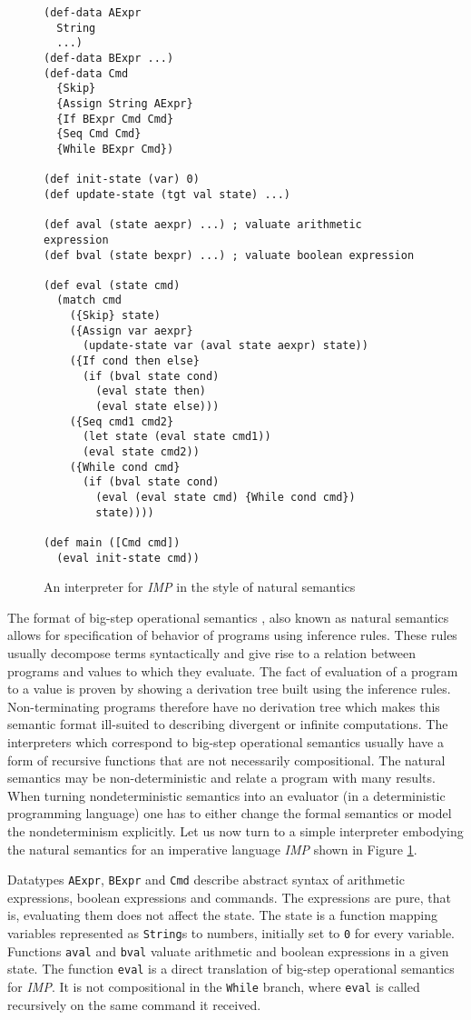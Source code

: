 \begin{figure}[ht!]
\begin{lstlisting}
(def-data AExpr
  String
  ...)
(def-data BExpr ...)
(def-data Cmd
  {Skip}
  {Assign String AExpr}
  {If BExpr Cmd Cmd}
  {Seq Cmd Cmd}
  {While BExpr Cmd})

(def init-state (var) 0)
(def update-state (tgt val state) ...)

(def aval (state aexpr) ...) ; valuate arithmetic expression
(def bval (state bexpr) ...) ; valuate boolean expression

(def eval (state cmd)
  (match cmd
    ({Skip} state)
    ({Assign var aexpr}
      (update-state var (aval state aexpr) state))
    ({If cond then else}
      (if (bval state cond)
        (eval state then)
        (eval state else)))
    ({Seq cmd1 cmd2}
      (let state (eval state cmd1))
      (eval state cmd2))
    ({While cond cmd}
      (if (bval state cond)
        (eval (eval state cmd) {While cond cmd})
        state))))

(def main ([Cmd cmd])
  (eval init-state cmd))
\end{lstlisting}
\caption{An interpreter for \textit{IMP} in the style of natural semantics}
\label{fig:evaluator-imp}
\end{figure}

The format of big-step operational semantics \cite{kahn-natural-semantics}, also known as natural semantics allows for specification of behavior of programs using inference rules.
These rules usually decompose terms syntactically and give rise to a relation between programs and values to which they evaluate.
The fact of evaluation of a program to a value is proven by showing a derivation tree built using the inference rules.
Non-terminating programs therefore have no derivation tree which makes this semantic format ill-suited to describing divergent or infinite computations.
The interpreters which correspond to big-step operational semantics usually have a form of recursive functions that are not necessarily compositional.
The natural semantics may be non-deterministic and relate a program with many results.
When turning nondeterministic semantics into an evaluator (in a deterministic programming language) one has to either change the formal semantics or model the nondeterminism explicitly.
Let us now turn to a simple interpreter embodying the natural semantics for an imperative language \textit{IMP} shown in Figure \ref{fig:evaluator-imp}.

Datatypes \lstinline!AExpr!, \lstinline!BExpr! and \lstinline!Cmd! describe abstract syntax of arithmetic expressions, boolean expressions and commands.
The expressions are pure, that is, evaluating them does not affect the state.
The state is a function mapping variables represented as \lstinline!String!s to numbers, initially set to \lstinline!0! for every variable.
Functions \lstinline!aval! and \lstinline!bval! valuate arithmetic and boolean expressions in a given state.
The function \lstinline!eval! is a direct translation of big-step operational semantics for \textit{IMP}.
It is not compositional in the \lstinline!While! branch, where \lstinline!eval! is called recursively on the same command it received.


